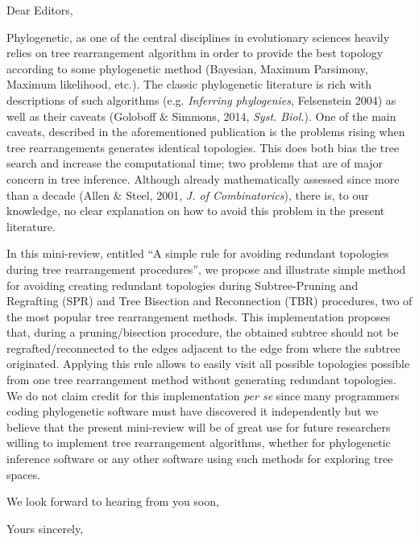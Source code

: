 \documentclass[11pt]{letter}
\begin{document}
\begin{letter}{}
\opening{Dear Editors,}

Phylogenetic, as one of the central disciplines in evolutionary sciences heavily relies on tree rearrangement algorithm in order to provide the best topology according to some phylogenetic method (Bayesian, Maximum Parsimony, Maximum likelihood, etc.).
The classic phylogenetic literature is rich with descriptions of such algorithms (e.g. \textit{Inferring phylogenies}, Felsenstein 2004) as well as their caveats (Goloboff \& Simmons, 2014, \textit{Syst. Biol.}).
One of the main caveats, described in the aforementioned publication is the problems rising when tree rearrangements generates identical topologies.
This does both bias the tree search and increase the computational time; two problems that are of major concern in tree inference. 
Although already mathematically assessed since more than a decade (Allen \& Steel, 2001, \textit{J. of Combinatorics}), there is, to our knowledge, no clear explanation on how to avoid this problem in the present literature.

In this mini-review, entitled ``A simple rule for avoiding redundant topologies during tree rearrangement procedures'', we propose and illustrate simple method for avoiding creating redundant topologies during Subtree-Pruning and Regrafting (SPR) and Tree Bisection and Reconnection (TBR) procedures, two of the most popular tree rearrangement methods.
This implementation proposes that, during a pruning/bisection procedure, the obtained subtree should not be regrafted/reconnected to the edges adjacent to the edge from where the subtree originated.
Applying this rule allows to easily visit all possible topologies possible from one tree rearrangement method without generating redundant topologies.
We do not claim credit for this implementation \textit{per se} since many programmers coding phylogenetic software must have discovered it independently but we believe that the present mini-review will be of great use for future researchers willing to implement tree rearrangement algorithms, whether for phylogenetic inference software or any other software using such methods for exploring tree spaces.

We look forward to hearing from you soon,

\closing{Yours sincerely,}

\end{letter}
\end{document}
